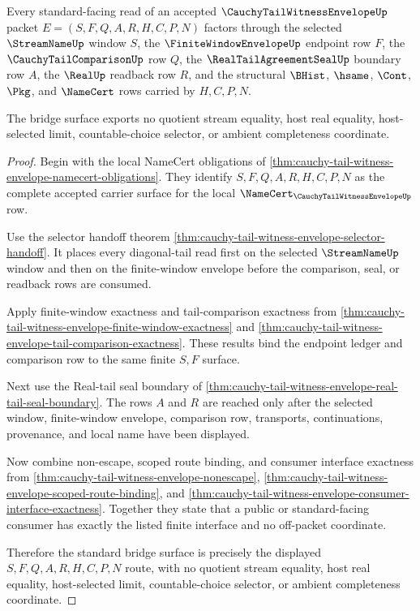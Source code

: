 \begin{theorem}
\label{thm:cauchy-tail-witness-envelope-standard-bridge-surface}
Every standard-facing read of an accepted $\CauchyTailWitnessEnvelopeUp$ packet $E=(S,F,Q,A,R,H,C,P,N)$ factors through the selected $\StreamNameUp$ window $S$, the $\FiniteWindowEnvelopeUp$ endpoint row $F$, the $\CauchyTailComparisonUp$ row $Q$, the $\RealTailAgreementSealUp$ boundary row $A$, the $\RealUp$ readback row $R$, and the structural $\BHist$, $\hsame$, $\Cont$, $\Pkg$, and $\NameCert$ rows carried by $H,C,P,N$.

The bridge surface exports no quotient stream equality, host real equality, host-selected limit, countable-choice selector, or ambient completeness coordinate.
\end{theorem}
\begin{proof}
Begin with the local NameCert obligations of \autoref{thm:cauchy-tail-witness-envelope-namecert-obligations}. They identify $S,F,Q,A,R,H,C,P,N$ as the complete accepted carrier surface for the local $\NameCert_{\CauchyTailWitnessEnvelopeUp}$ row.

Use the selector handoff theorem \autoref{thm:cauchy-tail-witness-envelope-selector-handoff}. It places every diagonal-tail read first on the selected $\StreamNameUp$ window and then on the finite-window envelope before the comparison, seal, or readback rows are consumed.

Apply finite-window exactness and tail-comparison exactness from \autoref{thm:cauchy-tail-witness-envelope-finite-window-exactness} and \autoref{thm:cauchy-tail-witness-envelope-tail-comparison-exactness}. These results bind the endpoint ledger and comparison row to the same finite $S,F$ surface.

Next use the Real-tail seal boundary of \autoref{thm:cauchy-tail-witness-envelope-real-tail-seal-boundary}. The rows $A$ and $R$ are reached only after the selected window, finite-window envelope, comparison row, transports, continuations, provenance, and local name have been displayed.

Now combine non-escape, scoped route binding, and consumer interface exactness from \autoref{thm:cauchy-tail-witness-envelope-nonescape}, \autoref{thm:cauchy-tail-witness-envelope-scoped-route-binding}, and \autoref{thm:cauchy-tail-witness-envelope-consumer-interface-exactness}. Together they state that a public or standard-facing consumer has exactly the listed finite interface and no off-packet coordinate.

Therefore the standard bridge surface is precisely the displayed $S,F,Q,A,R,H,C,P,N$ route, with no quotient stream equality, host real equality, host-selected limit, countable-choice selector, or ambient completeness coordinate.
\end{proof}

